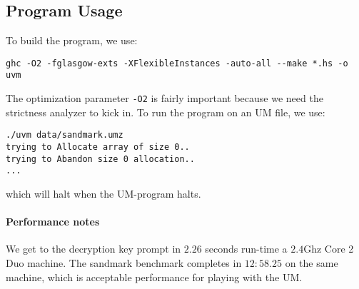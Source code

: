 \subsection{Program Usage}

To build the program, we use:
\begin{verbatim}
ghc -O2 -fglasgow-exts -XFlexibleInstances -auto-all --make *.hs -o uvm
\end{verbatim}

The optimization parameter \texttt{-O2} is fairly important because we
need the strictness analyzer to kick in. To run the program on an UM
file, we use:
\begin{verbatim}
./uvm data/sandmark.umz
trying to Allocate array of size 0..
trying to Abandon size 0 allocation..
...
\end{verbatim}
which will halt when the UM-program halts.

\paragraph{Performance notes}

We get to the decryption key prompt in $2.26$ seconds run-time a
$2.4$Ghz Core 2 Duo machine. The sandmark benchmark completes in
$12:58.25$ on the same machine, which is acceptable performance for
playing with the UM.

